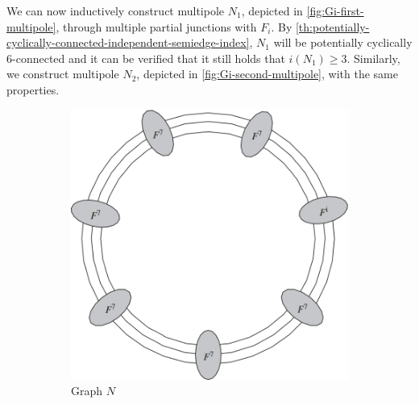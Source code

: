 \documentclass[12pt, twoside]{book}
\begin{document}
\begin{example}
	We can now inductively construct multipole $N_1$, depicted in \cref{fig:Gi-first-multipole}, through multiple partial junctions with $F_i$. By \cref{th:potentially-cyclically-connected-independent-semiedge-index}, $N_1$ will be potentially cyclically 6-connected and it can be verified that it still holds that $i(N_1)\geq 3$. Similarly, we construct multipole $N_2$, depicted in \cref{fig:Gi-second-multipole}, with the same properties.
	
	\begin{figure}
		\centering
		\begin{subfigure}[b]{0.45\textwidth}
			\centering
			\includegraphics[width=\textwidth]{images/Gi-before-subdivision}
			\caption{Graph $N$}
			\label{fig:Gi-without-middle-before-subdivisions}
		\end{subfigure}
		\hfill
		\begin{subfigure}[b]{0.45\textwidth}
			\centering

\end{subfigure}
\end{figure}
\end{example}
\end{document}
